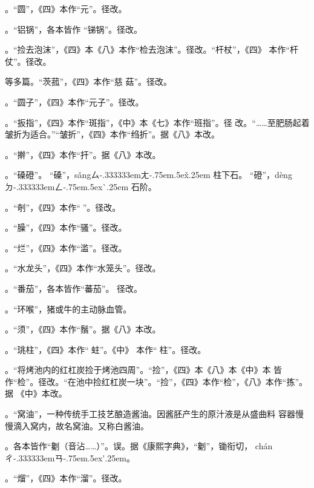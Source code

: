 。“圆”，《四》本作“元”。径改。

。“铝锅”，各本皆作
“锑锅”。\xeCJKnobreak{}径改。

。“捡去泡沫”，《四》本《八》本作“检去泡沫”。径改。“杆杖”，《四》
本作“杆仗”。径改。

等多篇。“茨菰”，《四》本作“慈
菇”。径改。

。“圆子”，《四》本作“元子”。径改。

。“扳指”，《四》本作“斑指”，《中》本《七》本作“班指”。径
改。“……至肥肠起着皱折为适合。”“皱折”，《四》本作“绉折”。据《八》本改。

。“擀”，《四》本作“扞”。据《八》本改。

。“磉磴”。
“磉”，{s\v{a}ng}{ㄙ\kern-.333333emㄤ\kern-.75em\raise.5ex\hbox{\v{}}\kern.25em}
柱下石。
“磴”，{d\`{e}ng}{ㄉ\kern-.333333emㄥ\kern-.75em\raise.5ex\hbox{\`{}}\kern.25em}
石阶。

。“剞”，《四》本作“𠟤”。径改。

。“臊”，《四》本作“骚”。径改。

。“烂”，《四》本作“滥”。径改。

。“水龙头”，《四》本作“水笼头”。径改。

。“番茄”，各本皆作“蕃茄”。
径改。

。“环喉”，猪或牛的主动脉血管。

。“须”，《四》本作“鬚”。据《八》本改。

。“珧柱”，《四》本作“𧎼蛀”。《中》
本作“𧎼柱”。径改。

。“将烤池内的红杠炭捡于烤池四周”。“捡”，《四》本《八》本《中》本
皆作“检”。径改。“在池中捡红杠炭一块”。“捡”，《四》本作“检”，《八》本作“拣”。据
《中》本改。

。“窝油”，一种传统手工技艺酿造酱油。因酱胚产生的原汁液是从盛曲料
容器慢慢滴入窝内，故名窝油。又称白酱油。

。各本皆作“劖（音沾……）”。误。据《康熙字典》，“劖”，锄衔切，
{ch\'{a}n}{ㄔ\kern-.333333emㄢ\kern-.75em\raise.5ex\hbox{\'{}}\kern.25em}。

。“熘”，《四》本作“溜”。径改。

